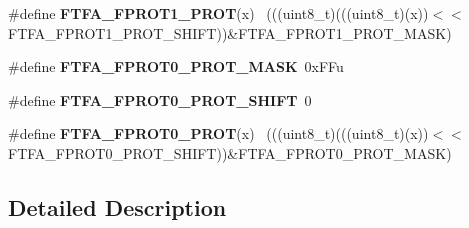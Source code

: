 \begin{DoxyCompactItemize}
\item 
\hypertarget{group___f_t_f_a___register___masks_ga4dba855bec64790407b74c556610b806}{}\#define {\bfseries F\+T\+F\+A\+\_\+\+F\+P\+R\+O\+T1\+\_\+\+P\+R\+O\+T}(x)                                        ~(((uint8\+\_\+t)(((uint8\+\_\+t)(x))$<$$<$F\+T\+F\+A\+\_\+\+F\+P\+R\+O\+T1\+\_\+\+P\+R\+O\+T\+\_\+\+S\+H\+I\+F\+T))\&F\+T\+F\+A\+\_\+\+F\+P\+R\+O\+T1\+\_\+\+P\+R\+O\+T\+\_\+\+M\+A\+S\+K)\label{group___f_t_f_a___register___masks_ga4dba855bec64790407b74c556610b806}

\item 
\hypertarget{group___f_t_f_a___register___masks_gac41f6c8343a42460ae9e13a58b2e7af5}{}\#define {\bfseries F\+T\+F\+A\+\_\+\+F\+P\+R\+O\+T0\+\_\+\+P\+R\+O\+T\+\_\+\+M\+A\+S\+K}~0x\+F\+Fu\label{group___f_t_f_a___register___masks_gac41f6c8343a42460ae9e13a58b2e7af5}

\item 
\hypertarget{group___f_t_f_a___register___masks_gaeaea51b92cd5019f8909242cc90e2050}{}\#define {\bfseries F\+T\+F\+A\+\_\+\+F\+P\+R\+O\+T0\+\_\+\+P\+R\+O\+T\+\_\+\+S\+H\+I\+F\+T}~0\label{group___f_t_f_a___register___masks_gaeaea51b92cd5019f8909242cc90e2050}

\item 
\hypertarget{group___f_t_f_a___register___masks_ga3effb7703c241ea120cba06e477d4aae}{}\#define {\bfseries F\+T\+F\+A\+\_\+\+F\+P\+R\+O\+T0\+\_\+\+P\+R\+O\+T}(x)                                        ~(((uint8\+\_\+t)(((uint8\+\_\+t)(x))$<$$<$F\+T\+F\+A\+\_\+\+F\+P\+R\+O\+T0\+\_\+\+P\+R\+O\+T\+\_\+\+S\+H\+I\+F\+T))\&F\+T\+F\+A\+\_\+\+F\+P\+R\+O\+T0\+\_\+\+P\+R\+O\+T\+\_\+\+M\+A\+S\+K)\label{group___f_t_f_a___register___masks_ga3effb7703c241ea120cba06e477d4aae}

\end{DoxyCompactItemize}


\subsection{Detailed Description}
